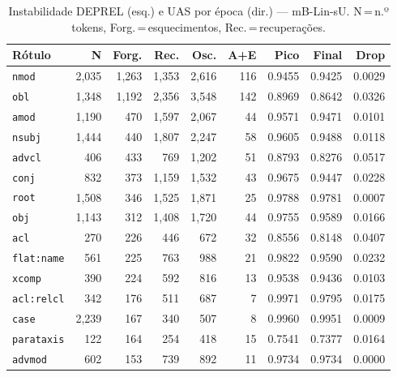 

\begin{table}[ht]
\centering
\caption{Instabilidade DEPREL (esq.) e UAS por época (dir.) --- mB-Lin-sU. N\,=\,n.º tokens, Forg.\,=\,esquecimentos, Rec.\,=\,recuperações.}
\label{tab:inst-bert-base-multilingual-cased-predictions-ablacao-linear}
\begin{minipage}[t]{0.54\linewidth}
\centering\tiny
\begin{tabular}{lrrrrrrrr}
\toprule
\textbf{Rótulo} & \textbf{N} & \textbf{Forg.} & \textbf{Rec.} & \textbf{Osc.} & \textbf{A+E} & \textbf{Pico} & \textbf{Final} & \textbf{Drop} \\
\midrule
\texttt{nmod} & 2,035 & 1,263 & 1,353 & 2,616 & 116 & 0.9455 & 0.9425 & 0.0029 \\
\texttt{obl} & 1,348 & 1,192 & 2,356 & 3,548 & 142 & 0.8969 & 0.8642 & 0.0326 \\
\texttt{amod} & 1,190 & 470 & 1,597 & 2,067 & 44 & 0.9571 & 0.9471 & 0.0101 \\
\texttt{nsubj} & 1,444 & 440 & 1,807 & 2,247 & 58 & 0.9605 & 0.9488 & 0.0118 \\
\texttt{advcl} & 406 & 433 & 769 & 1,202 & 51 & 0.8793 & 0.8276 & 0.0517 \\
\texttt{conj} & 832 & 373 & 1,159 & 1,532 & 43 & 0.9675 & 0.9447 & 0.0228 \\
\texttt{root} & 1,508 & 346 & 1,525 & 1,871 & 25 & 0.9788 & 0.9781 & 0.0007 \\
\texttt{obj} & 1,143 & 312 & 1,408 & 1,720 & 44 & 0.9755 & 0.9589 & 0.0166 \\
\texttt{acl} & 270 & 226 & 446 & 672 & 32 & 0.8556 & 0.8148 & 0.0407 \\
\texttt{flat\!:\!name} & 561 & 225 & 763 & 988 & 21 & 0.9822 & 0.9590 & 0.0232 \\
\texttt{xcomp} & 390 & 224 & 592 & 816 & 13 & 0.9538 & 0.9436 & 0.0103 \\
\texttt{acl\!:\!relcl} & 342 & 176 & 511 & 687 & 7 & 0.9971 & 0.9795 & 0.0175 \\
\texttt{case} & 2,239 & 167 & 340 & 507 & 8 & 0.9960 & 0.9951 & 0.0009 \\
\texttt{parataxis} & 122 & 164 & 254 & 418 & 15 & 0.7541 & 0.7377 & 0.0164 \\
\texttt{advmod} & 602 & 153 & 739 & 892 & 11 & 0.9734 & 0.9734 & 0.0000 \\
\bottomrule
\end{tabular}
\end{minipage}

\end{table}
